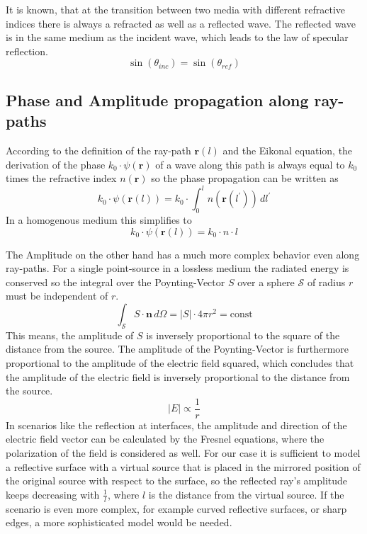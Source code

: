 It is known, that at the transition between two media with different refractive indices there is always a refracted as well as a reflected wave.
The reflected wave is in the same medium as the incident wave, which leads to the law of specular reflection.
\begin{equation}
    \sin(\theta_{inc}) = \sin(\theta_{ref})
\end{equation}


\subsection{Phase and Amplitude propagation along ray-paths}
According to the definition of the ray-path \(\mathbf{r}(l)\) and the Eikonal equation, the derivation of the phase \(k_0 \cdot \psi(\mathbf{r})\) of a wave along this path is always equal to \(k_0\) times the refractive index \(n(\mathbf{r})\) so the phase propagation can be written as
\begin{equation}
    k_0 \cdot \psi(\mathbf{r}(l)) = k_0 \cdot \int_{0}^{l} n(\mathbf{r}(l^{\prime})) \, dl^{\prime}
\end{equation}
In a homogenous medium this simplifies to
\begin{equation}
    k_0 \cdot \psi(\mathbf{r}(l)) = k_0 \cdot n \cdot l
\end{equation}

The Amplitude on the other hand has a much more complex behavior even along ray-paths.
For a single point-source in a lossless medium the radiated energy is conserved so the integral over the Poynting-Vector \(S\) over a sphere \(\mathcal{S} \) of radius \(r\) must be independent of \(r\).
\begin{equation}
    \int_\mathcal{S}  S \cdot \mathbf{n} \, d\Omega = |S| \cdot 4\pi r^2 = \text{const}
\end{equation}
This means, the amplitude of \(S\) is inversely proportional to the square of the distance from the source.
The amplitude of the Poynting-Vector is furthermore proportional to the amplitude of the electric field squared, which concludes that the amplitude of the electric field is inversely proportional to the distance from the source.
\begin{equation}
    |E| \propto \frac{1}{r}
\end{equation}
In scenarios like the reflection at interfaces, the amplitude and direction of the electric field vector can be calculated by the Fresnel equations, where the polarization of the field is considered as well.
For our case it is sufficient to model a reflective surface with a virtual source that is placed in the mirrored position of the original source with respect to the surface, so the reflected ray's amplitude keeps decreasing with \(\frac{1}{l}\), where \(l\) is the distance from the virtual source.
If the scenario is even more complex, for example curved reflective surfaces, or sharp edges, a more sophisticated model would be needed.

